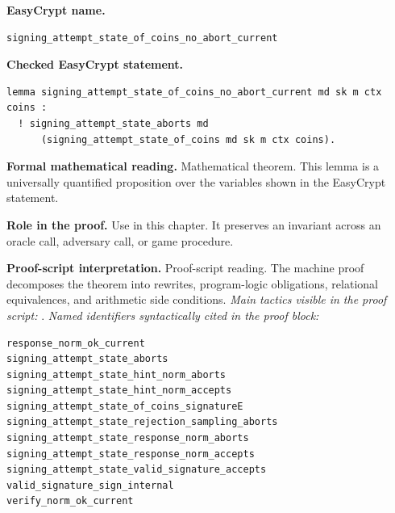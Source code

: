 \begin{formaltheorem}
\noindent\textbf{EasyCrypt name.}
\begin{lstlisting}[language=EasyCrypt,basicstyle=\ttfamily\scriptsize]
signing_attempt_state_of_coins_no_abort_current
\end{lstlisting}
\noindent\textbf{Checked EasyCrypt statement.}
\begin{lstlisting}[language=EasyCrypt,basicstyle=\ttfamily\scriptsize]
lemma signing_attempt_state_of_coins_no_abort_current md sk m ctx coins :
  ! signing_attempt_state_aborts md
      (signing_attempt_state_of_coins md sk m ctx coins).
\end{lstlisting}
\noindent\textbf{Formal mathematical reading.}
Mathematical theorem. This lemma is a universally quantified proposition over the variables shown in the EasyCrypt statement.

\noindent\textbf{Role in the proof.}
Use in this chapter. It preserves an invariant across an oracle call, adversary call, or game procedure.

\noindent\textbf{Proof-script interpretation.}
Proof-script reading. The machine proof decomposes the theorem into rewrites, program-logic obligations, relational equivalences, and arithmetic side conditions.
\emph{Main tactics visible in the proof script:} .
\emph{Named identifiers syntactically cited in the proof block:}
\begin{lstlisting}[language=EasyCrypt,basicstyle=\ttfamily\scriptsize]
response_norm_ok_current
signing_attempt_state_aborts
signing_attempt_state_hint_norm_aborts
signing_attempt_state_hint_norm_accepts
signing_attempt_state_of_coins_signatureE
signing_attempt_state_rejection_sampling_aborts
signing_attempt_state_response_norm_aborts
signing_attempt_state_response_norm_accepts
signing_attempt_state_valid_signature_accepts
valid_signature_sign_internal
verify_norm_ok_current
\end{lstlisting}

\end{formaltheorem}

